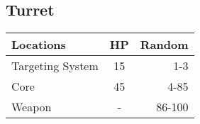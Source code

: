 \begin{multicols}{2}
\subsection{Turret}
\begin{minipage}{\columnwidth}
	\begin{tabularx}{\columnwidth}{|X|c|r|}
		\hline
		Locations        & HP & Random \\ \hline
		Targeting System & 15 &    1-3 \\ \hline
		Core             & 45 &   4-85 \\ \hline
		Weapon           & -  & 86-100 \\ \hline
	\end{tabularx}
\end{minipage}
\end{multicols}
